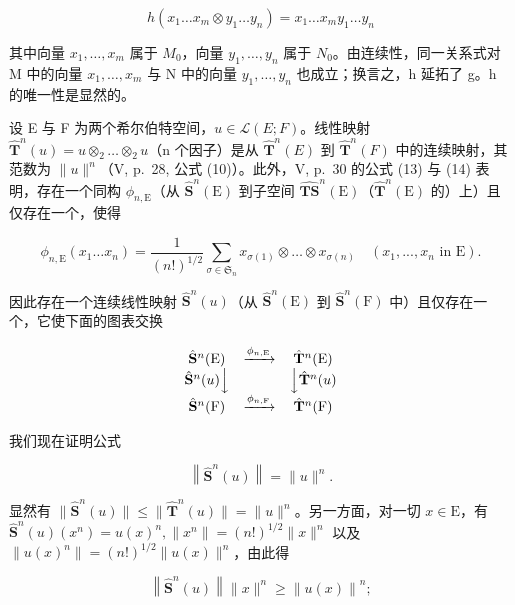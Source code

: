 \[
h (x _ {1} \dots x _ {m} \otimes y _ {1} \dots y _ {n}) = x _ {1} \dots x _ {m} y _ {1} \dots y _ {n}
\]

其中向量 \(x_{1}, \ldots, x_{m}\) 属于 \(M_{0}\)，向量 \(y_{1}, \ldots, y_{n}\) 属于 \(N_{0}\)。由连续性，同一关系式对 M 中的向量 \(x_{1}, \ldots, x_{m}\) 与 N 中的向量 \(y_{1}, \ldots, y_{n}\) 也成立；换言之，h 延拓了 g。h 的唯一性是显然的。

设 E 与 F 为两个希尔伯特空间，\(u \in \mathcal{L}(E; F)\)。线性映射 \(\hat{\mathbf{T}}^{n}(u) = u \otimes_{2} \ldots \otimes_{2} u\)（n 个因子）是从 \(\hat{\mathbf{T}}^{n}(E)\) 到 \(\hat{\mathbf{T}}^{n}(F)\) 中的连续映射，其范数为 \(\|u\|^{n}\)（V, p.~28, 公式 (10)）。此外，V, p.~30 的公式 (13) 与 (14) 表明，存在一个同构 \(\phi_{n,\mathrm{E}}\)（从 \(\hat{\mathbf{S}}^n (\mathrm{E})\) 到子空间 \(\widehat{\mathbf{T}\mathbf{S}}^n (\mathrm{E})\)（\(\hat{\mathbf{T}}^n (\mathrm{E})\) 的）上）且仅存在一个，使得

\[
\phi_ {n, \mathrm{E}} (x _ {1} \dots x _ {n}) = \frac {1}{(n !) ^ {1 / 2}} \sum_ {\sigma \in \mathfrak {S} _ {n}} x _ {\sigma (1)} \otimes \dots \otimes x _ {\sigma (n)} \quad (x _ {1},..., x _ {n} \text { in } \mathrm{E}).\tag{18}
\]

因此存在一个连续线性映射 \(\hat{\mathbf{S}}^{n}(u)\)（从 \(\hat{\mathbf{S}}^{n}(\mathrm{E})\) 到 \(\hat{\mathbf{S}}^{n}(\mathrm{F})\) 中）且仅存在一个，它使下面的图表交换

\[
\begin{array}{c c c} \hat {\mathbf {S}} ^ {n} (\mathrm{E}) & \xrightarrow {\phi_ {n , \mathrm{E}}} & \hat {\mathbf {T}} ^ {n} (\mathrm{E}) \\ \hat {\mathbf {S}} ^ {n} (u) \Big \downarrow & & \Big \downarrow \hat {\mathbf {T}} ^ {n} (u) \\ \hat {\mathbf {S}} ^ {n} (\mathrm{F}) & \xrightarrow {\phi_ {n , \mathrm{F}}} & \hat {\mathbf {T}} ^ {n} (\mathrm{F}) \end{array}
\]

我们现在证明公式

\[
\left\| \hat {\mathbf {S}} ^ {n} (u) \right\| = \| u \| ^ {n}.\tag{19}
\]

显然有 \(\| \hat{\mathbf{S}}^n (u)\| \leqslant \| \hat{\mathbf{T}}^n (u)\| = \| u\| ^n\)。另一方面，对一切 \(x\in \mathrm{E}\)，有 \(\hat{\mathbf{S}}^n (u)(x^n) = u(x)^n,\| x^n\| = (n!)^{1 / 2}\| x\| ^n\) 以及 \(\| u(x)^n\| = (n!)^{1 / 2}\| u(x)\| ^n\)，由此得

\[
\left\| \hat {\mathbf {S}} ^ {n} (u) \right\| \| x \| ^ {n} \geqslant \left\| u (x) \right\| ^ {n};
\]

